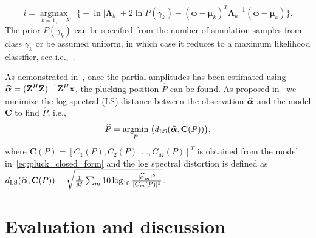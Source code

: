 \documentclass{article}
\begin{document}
\begin{sloppy}
\begin{equation}
  i\!=\!\underset{k=1,\dots,K}{\operatorname{argmax\!\!\!\!\!}}\;
\bigg\{\!\!\! -\!\ln \lvert \boldsymbol{\Lambda}_k\! \rvert\! +\! 2 \!\ln P(\!\gamma_k\!) \!-\! (\boldsymbol{\phi}-\boldsymbol{\mu}_k)^T \boldsymbol{\Lambda}_k^{\!-1} (\boldsymbol{\phi}-\boldsymbol{\mu}_k)    %
\!\!\bigg\}.
\end{equation}
%
The prior $P(\gamma_k)$ can be specified from the number of simulation samples from class $\gamma_k$ or be assumed uniform, in which case it reduces to a maximum likelihood classifier, see i.e.,~\cite{mspr}.
%

\noindent As demonstrated in~\cite{hjerrild::icassp19}, once the partial amplitudes has been estimated using $\text{\boldmath${\widehat\alpha}$} = (\mathbf{Z}^H\mathbf{Z})^{-1}\mathbf{Z}^H\mathbf x$, the plucking position $\widehat{P}$ can be found. As proposed in~\cite{hjerrild::icassp19} we minimize the log spectral (LS) distance between the observation $\text{\boldmath${\widehat\alpha}$}$ and the model $\mathbf{C}$ to find $\widehat{P}$, i.e., 
\begin{equation}
    \widehat{P} = \underset{P}{\operatorname{argmin}}\;{\big(d_{\textup{LS}}(\text{\boldmath${\widehat\alpha}$},\mathbf{C}(P))\big)},
\end{equation}
where $\mathbf{C}(P) = [C_1(P),C_2(P),\dots,C_M(P)]^T$ is obtained from the model in~\eqref{eq:pluck_closed_form} and the log spectral distortion is defined as
$    d_{\textup{LS}}(\text{\boldmath${\widehat\alpha}$},\mathbf{C}(P)) = \sqrt{ \frac{1}{M} \sum_m 10\log_{10} \frac{\lvert\widehat{\alpha}_m\rvert^2}{\lvert C_m(P)\rvert^2} }$.
%
%
%
%
%
%
%
\section{Evaluation and discussion} %
\label{sec:experiments}

%
%
%
%
%
%


\end{sloppy}
\end{document}

